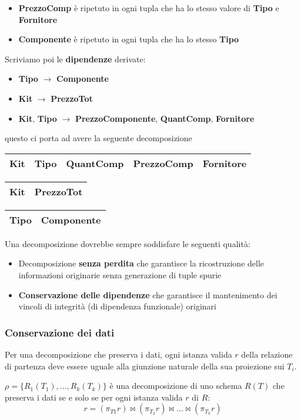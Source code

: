 \begin{example}[Decomposizione]
\begin{itemize}
		\item \textbf{PrezzoComp} è ripetuto in ogni tupla che ha lo stesso valore di \textbf{Tipo} e \textbf{Fornitore}
		\item \textbf{Componente} è ripetuto in ogni tupla che ha lo stesso \textbf{Tipo}
	\end{itemize}
	\newpage
	\noindent Scriviamo poi le \textbf{dipendenze} derivate:
	\begin{itemize}
		\item \textbf{Tipo} $\to$ \textbf{Componente}
		\item \textbf{Kit} $\to$ \textbf{PrezzoTot}
		\item \textbf{Kit}, \textbf{Tipo} $\to$ \textbf{PrezzoComponente}, \textbf{QuantComp}, \textbf{Fornitore}
	\end{itemize}
	questo ci porta ad avere la seguente decomposizione
	\begin{table}[!h]
		\centering
		\begin{tabular}{|c|c|c|c|c|}
			\hline
			\textbf{Kit} & \textbf{Tipo} & \textbf{QuantComp} & \textbf{PrezzoComp} & \textbf{Fornitore} \\
			\hline
		\end{tabular}\newline
		\begin{tabular}{|c|c|}
			\hline
			\textbf{Kit} & \textbf{PrezzoTot} \\
			\hline
		\end{tabular}
		\begin{tabular}{|c|c|}
			\hline
			\textbf{Tipo} & \textbf{Componente} \\
			\hline
		\end{tabular}
	\end{table}
\end{example}

\noindent Una decomposizione dovrebbe sempre soddisfare le seguenti qualità:
\begin{itemize}
	\item Decomposizione \textbf{senza perdita} che garantisce la ricostruzione delle informazioni originarie senza generazione di tuple spurie
	\item \textbf{Conservazione delle dipendenze} che garantisce il mantenimento dei	vincoli di integrità (di dipendenza funzionale) originari
\end{itemize}

\subsubsection{Conservazione dei dati}
Per una decomposizione che preserva i dati, ogni istanza valida $r$ della relazione di partenza deve essere uguale alla giunzione naturale della sua proiezione sui $T_i$.
\begin{definition}
	$\rho = \{R_1(T_1), \ldots, R_k(T_k)\}$ è una decomposizione di uno schema $R(T)$ che preserva i dati se e solo se per ogni istanza valida $r$ di $R$:
	\begin{equation}
		r = (\pi_{T1}r) \Join (\pi_{T_2}r) \Join \ldots \Join (\pi_{T_k}r)
	\end{equation}
\end{definition}
